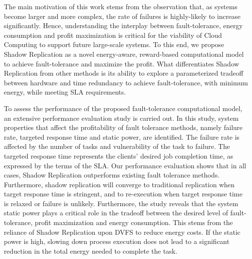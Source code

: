 \noindent 
The main motivation of this work stems from the observation that, as systems become larger and more complex, the
rate of failures is highly-likely to increase significantly.  
Hence, understanding the interplay between fault-tolerance, energy consumption 
and profit maximization is critical for the viability of Cloud Computing
to support future large-scale systems.
To this end, we propose Shadow Replication as a novel energy-aware, 
reward-based computational model to achieve fault-tolerance and
maximize the profit. 
What differentiates Shadow Replication from other
methods is its ability to explore a
parameterized tradeoff between hardware and time redundancy to achieve fault-tolerance, with minimum energy, 
while meeting SLA requirements. 

To assess the performance of the proposed fault-tolerance computational
model, an extensive performance evaluation study is carried out. 
In this study, system properties that affect the
profitability of fault tolerance methods, namely failure rate,
targeted response time and static power, are identified. The failure rate is
affected by the number of tasks and vulnerability of the task
to failure. The targeted response time represents the 
clients' desired job completion time, as expressed by the terms of the SLA.  
Our performance evaluation shows that in all cases, Shadow Replication outperforms
existing fault tolerance methods. Furthermore, shadow
replication will converge to traditional replication when target response time is stringent, and to re-execution when target response time is relaxed or failure is unlikely. Furthermore, the study reveals that the system static power plays a critical role in the tradeoff between the 
desired level of fault-tolerance, profit maximization and energy consumption.
This stems from the reliance of Shadow Replication upon DVFS to reduce 
energy costs. If the static power is high, slowing down process 
execution does not lead to a significant reduction in the total energy 
needed to complete the task.


%
%
